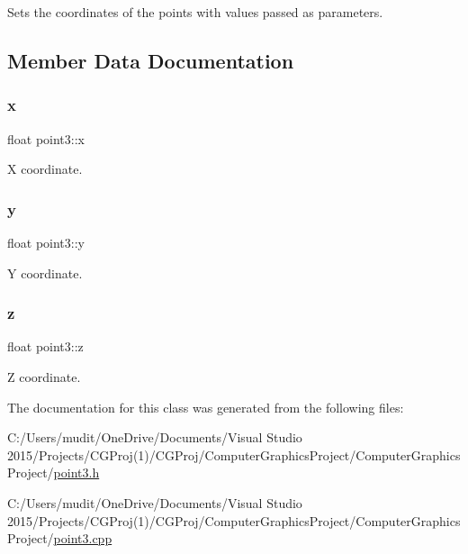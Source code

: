 Sets the coordinates of the points with values passed as parameters. 



\subsection{Member Data Documentation}
\hypertarget{classpoint3_aea247c715872b7973d9cfc18b7143b90}{}\label{classpoint3_aea247c715872b7973d9cfc18b7143b90} 
\subsubsection{\texorpdfstring{x}{x}}
{\footnotesize\ttfamily float point3\+::x}



X coordinate. 

\hypertarget{classpoint3_a55951af1fd6d03230ffde48142e5229b}{}\label{classpoint3_a55951af1fd6d03230ffde48142e5229b} 
\subsubsection{\texorpdfstring{y}{y}}
{\footnotesize\ttfamily float point3\+::y}



Y coordinate. 

\hypertarget{classpoint3_a72b1c18f7a71ef3b4f2c57248870cde5}{}\label{classpoint3_a72b1c18f7a71ef3b4f2c57248870cde5} 
\subsubsection{\texorpdfstring{z}{z}}
{\footnotesize\ttfamily float point3\+::z}



Z coordinate. 



The documentation for this class was generated from the following files\+:\begin{DoxyCompactItemize}
\item 
C\+:/\+Users/mudit/\+One\+Drive/\+Documents/\+Visual Studio 2015/\+Projects/\+C\+G\+Proj(1)/\+C\+G\+Proj/\+Computer\+Graphics\+Project/\+Computer\+Graphics\+Project/\hyperlink{point3_8h}{point3.\+h}\item 
C\+:/\+Users/mudit/\+One\+Drive/\+Documents/\+Visual Studio 2015/\+Projects/\+C\+G\+Proj(1)/\+C\+G\+Proj/\+Computer\+Graphics\+Project/\+Computer\+Graphics\+Project/\hyperlink{point3_8cpp}{point3.\+cpp}\end{DoxyCompactItemize}
